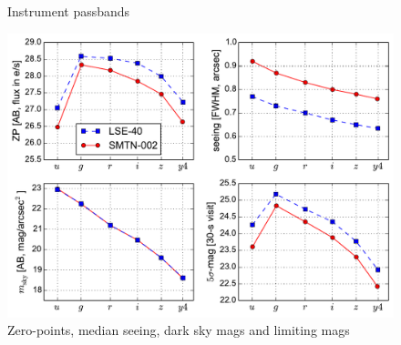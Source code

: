 \documentclass[\docopts]{\docclass}
\begin{document}
\begin{figure}[t]
\begin{center}
\caption{Instrument passbands}
\end{center}
\end{figure}


\begin{figure}[t]
\begin{center}
\includegraphics[width=\linewidth]{lsst_model_summary.pdf}
\caption{Zero-points, median seeing, dark sky mags and limiting mags}
\end{center}
\end{figure}
\end{document}
